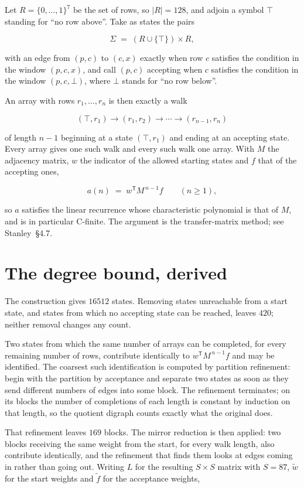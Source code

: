 \documentclass[11pt]{article}
\theoremstyle{definition}
\begin{document}
Let $R = \{0,\dots,1\}^{7}$ be the set of rows, so $|R| = 128$, and adjoin a symbol $\top$ standing for ``no row above''. Take as states the pairs

\[\Sigma \;=\; (R \cup \{\top\}) \times R,\]

with an edge from $(p,c)$ to $(c,x)$ exactly when row $c$ satisfies the condition in the window $(p,c,x)$, and call $(p,c)$ accepting when $c$ satisfies the condition in the window $(p,c,\bot)$, where $\bot$ stands for ``no row below''.

An array with rows $r_1,\dots,r_n$ is then exactly a walk

\[(\top,r_1) \to (r_1,r_2) \to \cdots \to (r_{n-1},r_n)\]

of length $n-1$ beginning at a state $(\top,r_1)$ and ending at an accepting state. Every array gives one such walk and every such walk one array. With $M$ the adjacency matrix, $w$ the indicator of the allowed starting states and $f$ that of the accepting ones,

\[a(n) \;=\; w^{\mathsf T} M^{\,n-1} f \qquad (n \ge 1),\]

so $a$ satisfies the linear recurrence whose characteristic polynomial is that of $M$, and is in particular C-finite. The argument is the transfer-matrix method; see Stanley~\S4.7.

\section{The degree bound, derived}

The construction gives $16512$ states. Removing states unreachable from a start state, and states from which no accepting state can be reached, leaves $420$; neither removal changes any count.

Two states from which the same number of arrays can be completed, for every remaining number of rows, contribute identically to $w^{\mathsf T}M^{\,n-1}f$ and may be identified. The coarsest such identification is computed by partition refinement: begin with the partition by acceptance and separate two states as soon as they send different numbers of edges into some block. The refinement terminates; on its blocks the number of completions of each length is constant by induction on that length, so the quotient digraph counts exactly what the original does.

That refinement leaves $169$ blocks. The mirror reduction is then applied: two blocks receiving the same weight from the start, for every walk length, also contribute identically, and the refinement that finds them looks at edges coming in rather than going out. Writing $L$ for the resulting $S \times S$ matrix with $S = 87$, $\tilde w$ for the start weights and $\tilde f$ for the acceptance weights,
\end{document}
